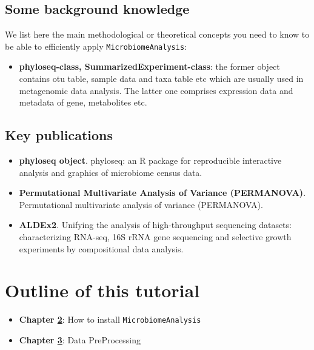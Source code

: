 \documentclass[
]{book}
\providecommand{\tightlist}{%
  \setlength{\itemsep}{0pt}\setlength{\parskip}{0pt}}
\begin{document}
\hypertarget{some-background-knowledge}{%
\subsection{Some background knowledge}\label{some-background-knowledge}}

We list here the main methodological or theoretical concepts you need to know to be able to efficiently apply \texttt{MicrobiomeAnalysis}:

\begin{itemize}
\tightlist
\item
  \textbf{phyloseq-class, SummarizedExperiment-class}: the former object contains otu table, sample data and taxa table etc which are usually used in metagenomic data analysis. The latter one comprises expression data and metadata of gene, metabolites etc.
\end{itemize}

\hypertarget{key-publications}{%
\subsection{Key publications}\label{key-publications}}

\begin{itemize}
\item
  \textbf{phyloseq object}. \citep{mcmurdie2013phyloseq} phyloseq: an R package for reproducible interactive analysis and graphics of microbiome census data.
\item
  \textbf{Permutational Multivariate Analysis of Variance (PERMANOVA)}. \citep{anderson2014permutational} Permutational multivariate analysis of variance (PERMANOVA).
\item
  \textbf{ALDEx2}. \citep{fernandes2014unifying} Unifying the analysis of high-throughput sequencing datasets: characterizing RNA-seq, 16S rRNA gene sequencing and selective growth experiments by compositional data analysis.
\end{itemize}

\hypertarget{outline-of-this-tutorial}{%
\section{Outline of this tutorial}\label{outline-of-this-tutorial}}

\begin{itemize}
\item
  \textbf{Chapter \href{https://zouhua.top/MicrobiomeAnalysis_book/how-to-install-microbiomeanalysis.html}{2}}: How to install \texttt{MicrobiomeAnalysis}
\item
  \textbf{Chapter \href{https://zouhua.top/MicrobiomeAnalysis_book/data-processing.html}{3}}: Data PreProcessing
\end{itemize}
\end{document}
